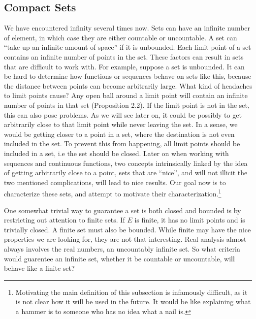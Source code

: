 \documentclass{article}
\theoremstyle{definition}
\begin{document}
	\subsection{Compact Sets}
	We have encountered infinity several times now. Sets can have an infinite number of element, in which case they are either countable or uncountable. A set can ``take up an infinite amount of space'' if it is unbounded. Each limit point of a set contains an infinite number of points in the set. These factors can result in sets that are difficult to work with. For example, suppose a set is unbounded. It can be hard to determine how functions or sequences behave on sets like this, because the distance between points can become arbitrarily large. What kind of headaches to limit points cause? Any open ball around a limit point will contain an infinite number of points in that set (Proposition 2.2). If the limit point is not in the set, this can also pose problems. As we will see later on, it could be possibly to get arbitrarily close to that limit point while never leaving the set. In a sense, we would be getting closer to a point in a set, where the destination is not even included in the set. To prevent this from happening, all limit points should be included in a set, i.e the set should be closed. Later on when working with sequences and continuous functions, two concepts intrinsically linked by the idea of getting arbitrarily close to a point, sets that are ``nice'', and will not illicit the two mentioned complications, will lead to nice results. Our goal now is to characterize these sets, and attempt to motivate their characterization.\footnote{Motivating the main definition of this subsection is infamously difficult, as it is not clear how it will be used in the future. It would be like explaining what a hammer is to someone who has no idea what a nail is. }   
	
	One somewhat trivial way to guarantee a set is both closed and bounded is by restricting out attention to finite sets. If $ E $ is finite, it has no limit points and is trivially closed. A finite set must also be bounded. While finite may have the nice properties we are looking for, they are not that interesting. Real analysis almost always involves the real numbers, an uncountably infinite set. So what criteria would guarentee an infinite set, whether it be countable or uncountable, will behave like a finite set?
	
\end{document}
